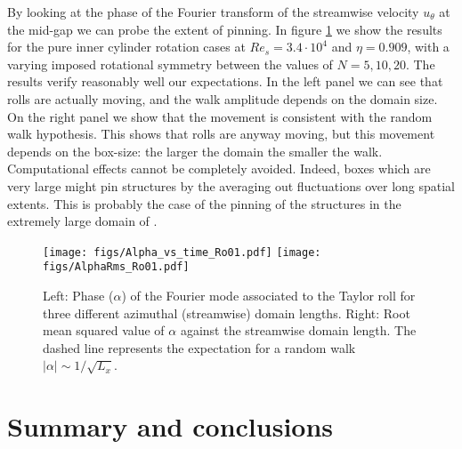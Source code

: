 \documentclass{jfm}
\begin{document}
By looking at the phase of the Fourier transform of the streamwise velocity $u_\theta$ at the mid-gap we can probe the extent of pinning. In figure \ref{fi:alpha} we show the results for the pure inner cylinder rotation cases at $Re_s=3.4\cdot10^4$ and $\eta=0.909$, with a varying imposed rotational symmetry between the values of $N=5,10,20$. The results verify reasonably well our expectations. In the left panel we can see that rolls are actually moving, and the walk amplitude depends on the domain size. On the right panel we show that the movement is consistent with the random walk hypothesis. This shows that rolls are anyway moving, but this movement depends on the box-size: the larger the domain the smaller the walk. Computational effects cannot be completely avoided. Indeed, boxes which are very large might pin structures by the averaging out fluctuations over long spatial extents. This is probably the case of the pinning of the structures in the extremely large domain of \cite{lee18}. 

\begin{figure}
\texttt{[image: figs/Alpha\_vs\_time\_Ro01.pdf]}
\texttt{[image: figs/AlphaRms\_Ro01.pdf]}
\centering
\caption{Left: Phase ($\alpha$) of the Fourier mode associated to the Taylor roll for three different azimuthal (streamwise) domain lengths. Right: Root mean squared value of $\alpha$ against the streamwise domain length. The dashed line represents the expectation for a random walk $|\alpha|\sim 1/\sqrt{L_x}$. }
\label{fi:alpha} 
\end{figure}

\section{Summary and conclusions}\label{sec:conclusion}
\end{document}
